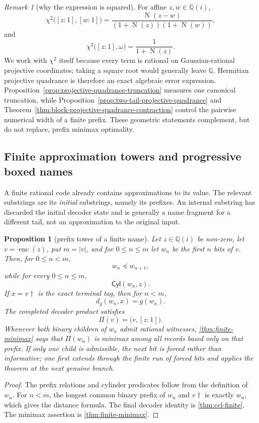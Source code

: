 \documentclass[10pt]{article}
\newtheorem{proposition}[theorem]{Proposition}
\theoremstyle{definition}
\theoremstyle{remark}
\newtheorem{remark}[theorem]{Remark}
\newcommand{\Q}{\mathbb{Q}}
\newcommand{\Qi}{\mathbb{Q}(i)}
\newcommand{\Norm}{\operatorname{N}}
\newcommand{\pref}{\preccurlyeq}
\newcommand{\Cyl}{\mathsf{Cyl}}
\newcommand{\term}{\dagger}
\newcommand{\Proj}[2]{[#1:#2]}
\begin{document}
\begin{remark}[why the expression is squared]
For affine $z,w\in\Qi$,
\[
 \chi^2\bigl(\Proj{z}{1},\Proj{w}{1}\bigr)
 =\frac{\Norm(z-w)}{(1+\Norm(z))(1+\Norm(w))},
\]
and
\[
 \chi^2\bigl(\Proj{z}{1},\omega\bigr)=\frac1{1+\Norm(z)}.
\]
We work with $\chi^2$ itself because every term is rational on
Gaussian-rational projective coordinates; taking a square root would
generally leave $\Q$.  Hermitian projective quadrance is therefore an exact
algebraic error expression.  Proposition~\ref{prop:projective-quadrance-truncation}
measures one canonical truncation, while
Proposition~\ref{prop:two-tail-projective-quadrance} and
Theorem~\ref{thm:block-projective-quadrance-contraction} control the pairwise
numerical width of a finite prefix.  These geometric statements complement,
but do not replace, prefix minimax optimality.
\end{remark}

\subsection{Finite approximation towers and progressive boxed names}

A finite rational code already contains approximations to its value.  The relevant substrings are its \emph{initial} substrings, namely its prefixes.  An internal substring has discarded the initial decoder state and is generally a name fragment for a different tail, not an approximation to the original input.

\begin{proposition}[prefix tower of a finite name]\label{prop:finite-prefix-tower}
Let $z\in\Qi$ be non-zero, let $v=\operatorname{enc}(z)$, put $m=|v|$, and for $0\le n\le m$ let $w_n$ be the first $n$ bits of $v$.  Then, for $0\le n<m$,
\[
 w_n\pref w_{n+1},
\]
while for every $0\le n\le m$,
\[
 \Cyl(w_n,z).
\]
If $x=v\term$ is the exact terminal tag, then for $n<m$,
\[
 d_g(w_n,x)=g(w_n).
\]
The completed decoder product satisfies
\[
 \Pi(v)=\bigl(v,\Proj{z}{1}\bigr).
\]
Whenever both binary children of $w_n$ admit rational witnesses, \autoref{thm:finite-minimax} says that $\Pi(w_n)$ is minimax among all records based only on that prefix.  If only one child is admissible, the next bit is forced rather than informative; one first extends through the finite run of forced bits and applies the theorem at the next genuine branch.
\end{proposition}

\begin{proof}
The prefix relations and cylinder predicates follow from the definition of $w_n$.  For $n<m$, the longest common binary prefix of $w_n$ and $v\term$ is exactly $w_n$, which gives the distance formula.  The final decoder identity is \autoref{thm:ccl-finite}.  The minimax assertion is \autoref{thm:finite-minimax}.
\end{proof}
\end{document}
